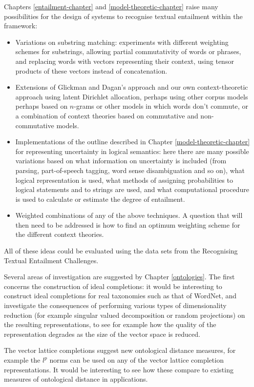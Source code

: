Chapters \ref{entailment-chapter} and \ref{model-theoretic-chapter} raise many possibilities for the design of systems to recognise textual entailment within the framework:
\begin{itemize}
\item Variations on substring matching: experiments with different weighting schemes for substrings, allowing partial commutativity of words or phrases, and replacing words with vectors representing their context, using tensor products of these vectors instead of concatenation.
\item Extensions of Glickman and Dagan's approach and our own context-theoretic approach using latent Dirichlet allocation, perhaps using other corpus models perhaps based on $n$-grams or other models in which words don't commute, or a combination of context theories based on commutative and non-commutative models.
\item Implementations of the outline described in Chapter \ref{model-theoretic-chapter} for representing uncertainty in logical semantics: here there are many possible variations based on what information on uncertainty is included (from parsing, part-of-speech tagging, word sense disambiguation and so on), what logical representation is used, what methods of assigning probabilities to logical statements and to strings are used, and what computational procedure is used to calculate or estimate the degree of entailment.
\item Weighted combinations of any of the above techniques. A question that will then need to be addressed is how to find an optimum weighting scheme for the different context theories.
\end{itemize}
All of these ideas could be evaluated using the data sets from the Recognising Textual Entailment Challenges.

Several areas of investigation are suggested by Chapter \ref{ontologies}. The first concerns the construction of ideal completions: it would be interesting to construct ideal completions for real taxonomies such as that of WordNet, and investigate the consequences of performing various types of dimensionality reduction (for example singular valued decomposition or random projections) on the resulting representations, to see for example how the quality of the representation degrades as the size of the vector space is reduced.

The vector lattice completions suggest new ontological distance measures, for example the $l^p$ norms can be used on any of the vector lattice completion representations. It would be interesting to see how these compare to existing measures of ontological distance in applications.

